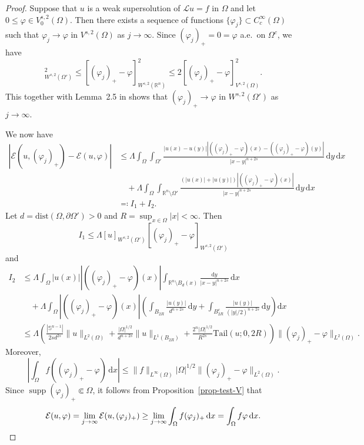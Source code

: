 \documentclass[11pt]{amsart}
\theoremstyle{plain}
\theoremstyle{definition}
\numberwithin{equation}{section}
\DeclareMathOperator{\supp}{supp}
\begin{document}
\begin{proof}
Suppose that $u$ is a weak supersolution of $\mathcal{L}u=f$ in $\Omega$ and let $0 \leq \varphi \in V_0^{s, 2}(\Omega)$. Then there exists a sequence of functions $\{\varphi_j\} \subset C_c^{\infty}(\Omega)$ such that $\varphi_j \to \varphi$ in $V^{s, 2}(\Omega)$ as $j \to \infty$. Since $(\varphi_j)_+=0=\varphi$ a.e.\ on $\Omega^c$, we have
\begin{equation*}
[(\varphi_j)_+-\varphi]_{W^{s, 2}(\Omega')}^2 \leq [(\varphi_j)_+-\varphi]_{W^{s, 2}(\mathbb{R}^n)}^2 \leq 2[(\varphi_j)_+-\varphi]_{V^{s, 2}(\Omega)}^2.
\end{equation*}
This together with Lemma~2.5 in \cite{BBK24} shows that $(\varphi_j)_+ \to \varphi$ in $W^{s, 2}(\Omega')$ as $j \to \infty$.

We now have
\begin{align*}
|\mathcal{E}(u, (\varphi_j)_+)-\mathcal{E}(u, \varphi)|
&\leq \Lambda \int_\Omega \int_{\Omega'} \frac{|u(x)-u(y)||((\varphi_j)_+-\varphi)(x) - ((\varphi_j)_+-\varphi)(y)|}{|x-y|^{n+2s}} \,\mathrm{d}y \,\mathrm{d}x \\
&\quad + \Lambda \int_\Omega \int_{\mathbb{R}^n \setminus \Omega'} \frac{(|u(x)|+|u(y)|) |((\varphi_j)_+-\varphi)(x)|}{|x-y|^{n+2s}} \,\mathrm{d}y \,\mathrm{d}x \\
&\eqqcolon I_1 + I_2.
\end{align*}
Let $d=\mathrm{dist}(\Omega, \partial\Omega')>0$ and $R=\sup_{x \in \Omega}|x|<\infty$. Then
\begin{equation*}
I_1 \leq \Lambda [u]_{W^{s, 2}(\Omega')} [(\varphi_j)_+-\varphi]_{W^{s, 2}(\Omega')}
\end{equation*}
and
\begin{align*}
I_2
&\leq \Lambda \int_\Omega |u(x)| |((\varphi_j)_+-\varphi)(x)| \int_{\mathbb{R}^n \setminus B_d(x)} \frac{\mathrm{d}y}{|x-y|^{n+2s}} \,\mathrm{d}x \\
&\quad + \Lambda \int_{\Omega} |((\varphi_j)_+-\varphi)(x)| \left( \int_{B_{2R}} \frac{|u(y)|}{d^{n+2s}} \,\mathrm{d}y + \int_{B_{2R}^c} \frac{|u(y)|}{(|y|/2)^{n+2s}} \,\mathrm{d}y \right) \mathrm{d}x \\
&\leq \Lambda \left( \frac{|\mathbb{S}^{n-1}|}{2s d^{2s}} \|u\|_{L^2(\Omega)} + \frac{|\Omega|^{1/2}}{d^{n+2s}} \|u\|_{L^1(B_{2R})} + \frac{2^{n} |\Omega|^{1/2}}{R^{2s}} \mathrm{Tail}(u; 0, 2R) \right) \|(\varphi_j)_+ - \varphi\|_{L^2(\Omega)}.
\end{align*}
Moreover,
\begin{equation*}
    \left| \int_\Omega f ((\varphi_j)_+ - \varphi) \,\mathrm{d}x \right| \leq \|f\|_{L^\infty(\Omega)} |\Omega|^{1/2} \|(\varphi_j)_+ - \varphi\|_{L^2(\Omega)}.
\end{equation*}
Since $\supp (\varphi_j)_+ \Subset \Omega$, it follows from Proposition~\ref{prop-test-V} that
\begin{equation*}
    \mathcal{E}(u, \varphi)=\lim_{j \to \infty}\mathcal{E}(u, (\varphi_j)_+) \geq \lim_{j \to \infty}\int_{\Omega}f(\varphi_j)_+ \,\mathrm{d}x =\int_{\Omega}f\varphi \,\mathrm{d}x. \qedhere
\end{equation*}
\end{proof}
\end{document}
